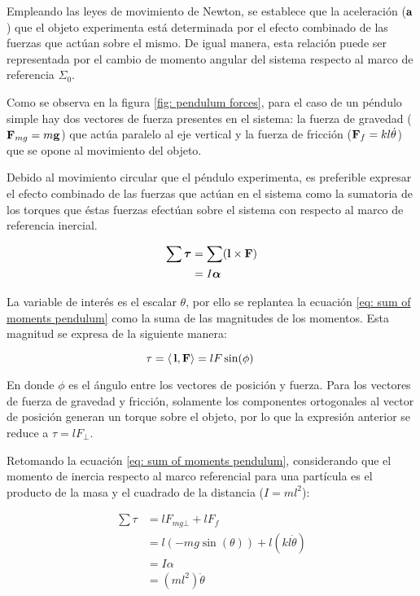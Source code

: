 Empleando las leyes de movimiento de Newton, 
se establece que la aceleración ($\bold{a}$) que el objeto
experimenta está determinada por el
efecto combinado de las fuerzas que actúan sobre el mismo.
De igual manera, esta relación puede ser representada por
el cambio de momento angular del sistema respecto al 
marco de referencia $\Sigma_0$.

Como se observa en la figura \ref{fig: pendulum forces}, 
para el caso de un péndulo simple 
hay dos vectores de fuerza presentes en el sistema:
la fuerza de gravedad ($\bold{F}_{mg} = m\bold{g}$) que actúa paralelo al eje vertical 
y la fuerza de fricción ($\bold{F}_f = kl\dot{\theta}$) que se opone al movimiento del objeto. 

Debido al movimiento circular que el péndulo experimenta,
es preferible expresar el efecto combinado
de las fuerzas que actúan en el sistema como
la sumatoria de los torques que éstas fuerzas
efectúan sobre el sistema con respecto al marco de
referencia inercial.

\begin{equation}
 \begin{split}
  \sum\boldsymbol{\tau} & = \sum (\bold{l} \times \bold{F})\\
  & = I \boldsymbol{\alpha}
 \end{split}
 \label{eq: sum of moments pendulum}
\end{equation}

La variable de interés es el escalar $\theta$, por ello
se replantea la ecuación \eqref{eq: sum of moments pendulum}
como la suma de las magnitudes de los momentos.
Esta magnitud se expresa de la siguiente manera:

\begin{equation}
 \tau =  \langle \, \bold{l} , \bold{F}\rangle=  l F \sin(\phi) \qquad 
\end{equation}

En donde $\phi$ es el ángulo entre los vectores de posición y fuerza. 
Para los vectores de fuerza de gravedad y fricción,
solamente los componentes ortogonales al vector de posición generan
un torque sobre el objeto, por lo que la expresión anterior se reduce a 
$\tau = l F_\bot$.

Retomando la ecuación \eqref{eq: sum of moments pendulum}, considerando 
que el momento de inercia respecto al marco referencial para una partícula es 
el producto de la masa y el cuadrado de la distancia ($ I = m l^2$):

\begin{equation}
\begin{split}
 \sum \tau &= l F_{mg\bot}  + l F_f\\
 & = l (-m g \sin(\theta))  + l (k l \dot{\theta})\\
 & = I \alpha \\
 & = (m l^2) \ddot{\theta}
 \end{split}
 \label{eq: sum of moments magnitude}
\end{equation}

